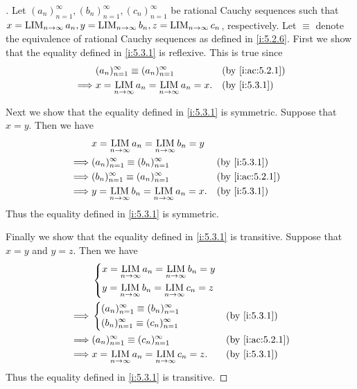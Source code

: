 \begin{proof}[]
  Let \((a_n)_{n = 1}^\infty, (b_n)_{n = 1}^\infty, (c_n)_{n = 1}^\infty\) be rational Cauchy sequences such that \(x = \operatorname*{LIM}_{n \to \infty} a_n, y = \operatorname*{LIM}_{n \to \infty} b_n, z = \operatorname*{LIM}_{n \to \infty} c_n\), respectively.
  Let \(\equiv\) denote the equivalence of rational Cauchy sequences as defined in \cref{i:5.2.6}.
  First we show that the equality defined in \cref{i:5.3.1} is reflexive.
  This is true since
  \begin{align*}
             & (a_n)_{n = 1}^\infty \equiv (a_n)_{n = 1}^\infty           &  & \by{i:ac:5.2.1} \\
    \implies & x = \LIM_{n \to \infty} a_n = \LIM_{n \to \infty} a_n = x. &  & \by{i:5.3.1}
  \end{align*}

  Next we show that the equality defined in \cref{i:5.3.1} is symmetric.
  Suppose that \(x = y\).
  Then we have
  \begin{align*}
             & x = \LIM_{n \to \infty} a_n = \LIM_{n \to \infty} b_n = y                       \\
    \implies & (a_n)_{n = 1}^\infty \equiv (b_n)_{n = 1}^\infty           &  & \by{i:5.3.1}    \\
    \implies & (b_n)_{n = 1}^\infty \equiv (a_n)_{n = 1}^\infty           &  & \by{i:ac:5.2.1} \\
    \implies & y = \LIM_{n \to \infty} b_n = \LIM_{n \to \infty} a_n = x. &  & \by{i:5.3.1}
  \end{align*}
  Thus the equality defined in \cref{i:5.3.1} is symmetric.

  Finally we show that the equality defined in \cref{i:5.3.1} is transitive.
  Suppose that \(x = y\) and \(y = z\).
  Then we have
  \begin{align*}
             & \begin{dcases}x = \LIM_{n \to \infty} a_n = \LIM_{n \to \infty} b_n = y \\
                 y = \LIM_{n \to \infty} b_n = \LIM_{n \to \infty} c_n = z
               \end{dcases}                         \\
    \implies & \begin{dcases}
                 (a_n)_{n = 1}^\infty \equiv (b_n)_{n = 1}^\infty \\
                 (b_n)_{n = 1}^\infty \equiv (c_n)_{n = 1}^\infty \\
               \end{dcases}                        &  & \by{i:5.3.1}                                           \\
    \implies & (a_n)_{n = 1}^\infty \equiv (c_n)_{n = 1}^\infty                           &  & \by{i:ac:5.2.1} \\
    \implies & x = \LIM_{n \to \infty} a_n = \LIM_{n \to \infty} c_n = z.                 &  & \by{i:5.3.1}
  \end{align*}
  Thus the equality defined in \cref{i:5.3.1} is transitive.
\end{proof}

